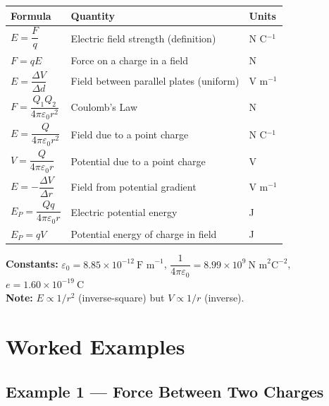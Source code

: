 \begin{minipage}{\linewidth}
\begin{tcolorbox}[colback=lightgold, colframe=accentgold]
\renewcommand{\arraystretch}{1.8}
\begin{tabular}{@{}lll@{}}
\toprule
\textbf{Formula} & \textbf{Quantity} & \textbf{Units} \\
\midrule
$E = \dfrac{F}{q}$ & Electric field strength (definition) & N C$^{-1}$ \\
$F = qE$ & Force on a charge in a field & N \\
$E = \dfrac{\Delta V}{\Delta d}$ & Field between parallel plates (uniform) & V m$^{-1}$ \\
$F = \dfrac{Q_1 Q_2}{4\pi\varepsilon_0 r^2}$ & Coulomb's Law & N \\
$E = \dfrac{Q}{4\pi\varepsilon_0 r^2}$ & Field due to a point charge & N C$^{-1}$ \\
$V = \dfrac{Q}{4\pi\varepsilon_0 r}$ & Potential due to a point charge & V \\
$E = -\dfrac{\Delta V}{\Delta r}$ & Field from potential gradient & V m$^{-1}$ \\
$E_P = \dfrac{Qq}{4\pi\varepsilon_0 r}$ & Electric potential energy & J \\
$E_P = qV$ & Potential energy of charge in field & J \\
\bottomrule
\end{tabular}
\end{tcolorbox}

\vspace{0.5em}
\begin{tcolorbox}[colback=lightblue, colframe=darkblue]
\textbf{Constants:}\quad
$\varepsilon_0 = 8.85\times10^{-12}\ \text{F m}^{-1}$,\quad
$\dfrac{1}{4\pi\varepsilon_0} = 8.99\times10^9\ \text{N m}^2\text{C}^{-2}$,\quad
$e = 1.60\times10^{-19}\ \text{C}$\\[0.3em]
\textbf{Note:} $E \propto 1/r^2$ (inverse-square) but $V \propto 1/r$ (inverse).
\end{tcolorbox}
\end{minipage}

\section{Worked Examples}

\subsection*{Example 1 — Force Between Two Charges}


